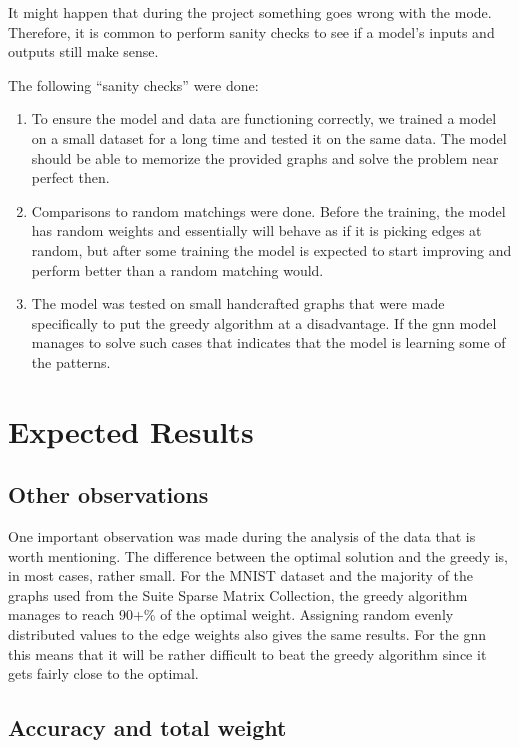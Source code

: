 It might happen that during the project something goes wrong with the mode. Therefore, it is common to perform sanity checks to see if a model's inputs and outputs still make sense.

The following “sanity checks” were done:

\begin{enumerate}
\item To ensure the model and data are functioning correctly, we trained a model on a small dataset for a long time and tested it on the same data. The model should be able to memorize the provided graphs and solve the problem near perfect then.

\item Comparisons to random matchings were done. Before the training, the model has random weights and essentially will behave as if it is picking edges at random, but after some training the model is expected to start improving and perform better than a random matching would.

\item The model was tested on small handcrafted graphs that were made specifically to put the greedy algorithm at a disadvantage. If the \gls{gnn} model manages to solve such cases that indicates that the model is learning some of the patterns.
\end{enumerate}	

\section{Expected Results}

\subsection{Other observations}

One important observation was made during the analysis of the data that is worth mentioning. The difference between the optimal solution and the greedy is, in most cases, rather small. For the MNIST dataset and the majority of the graphs used from the Suite Sparse Matrix Collection, the greedy algorithm manages to reach 90+\% of the optimal weight. Assigning random evenly distributed values to the edge weights also gives the same results. For the \gls{gnn} this means that it will be rather difficult to beat the greedy algorithm since it gets fairly close to the optimal.

\subsection{Accuracy and total weight}

